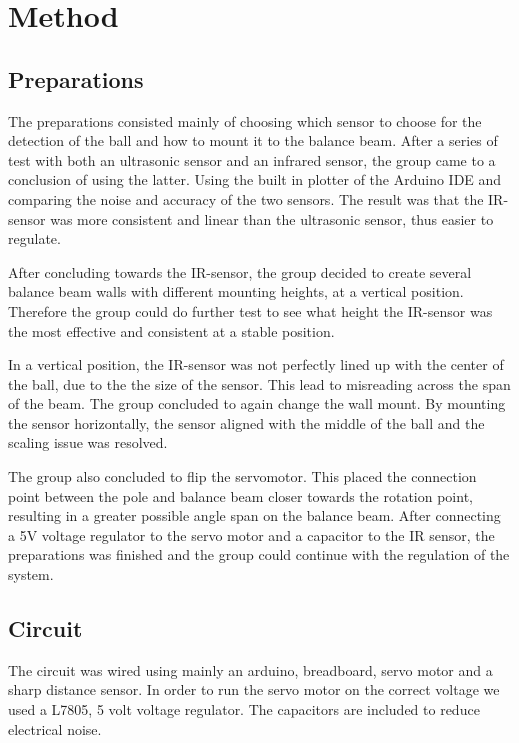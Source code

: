 \section{Method}
\subsection{Preparations}

The preparations consisted mainly of choosing which sensor to choose for the detection of the ball and how to mount it to the balance beam. After a series of test with both an ultrasonic sensor and an infrared sensor, the group came to a conclusion of using the latter. Using the built in plotter of the Arduino IDE and comparing the noise and accuracy of the two sensors. The result was that the IR-sensor was more consistent and linear than the ultrasonic sensor, thus easier to regulate.

After concluding towards the IR-sensor, the group decided to create several balance beam walls with different mounting heights, at a vertical position. Therefore the group could do further test to see what height the IR-sensor was the most effective and consistent at a stable position. 

In a vertical position, the IR-sensor was not perfectly lined up with the center of the ball, due to the the size of the sensor. This lead to misreading across the span of the beam. The group concluded to again change the wall mount. By mounting the sensor horizontally, the sensor aligned with the middle of the ball and the scaling issue was resolved. 

The group also concluded to flip the servomotor. This placed the connection point between the pole and balance beam closer towards the rotation point, resulting in a greater possible angle span on the balance beam. After connecting a 5V voltage regulator to the servo motor and a capacitor to the IR sensor, the preparations was finished and the group could continue with the regulation of the system. 
\subsection{Circuit}
The circuit was wired using mainly an arduino, breadboard, servo motor and a sharp distance sensor. In order to run the servo motor on the correct voltage we used a L7805, 5 volt voltage regulator. The capacitors are included to reduce electrical noise.

